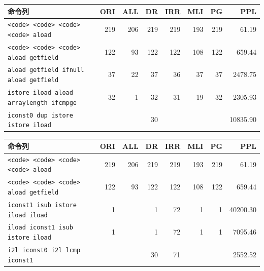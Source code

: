 \documentclass[12pt,twoside]{jreport}
\begin{document}
\begin{table}[t]
{  
  \begin{tabular}{lrrrrrrr}
   命令列 &
    \multicolumn{1}{p{1cm}}{ORI} & 
    \multicolumn{1}{p{1cm}}{ALL} & 
    \multicolumn{1}{p{1cm}}{DR} & 
    \multicolumn{1}{p{1cm}}{IRR} & 
    \multicolumn{1}{p{1cm}}{MLI} & 
    \multicolumn{1}{p{1cm}}{PG} & 
    \multicolumn{1}{p{1cm}}{PPL} \\ \hline
      \texttt{<code> <code> <code> <code> aload}    & 219 & 206 & 219 & 219 & 193 & 219 & 61.19 \\
    \texttt{<code> <code> <code> aload getfield}    & 122 &  93 & 122 & 122 & 108 & 122 & 659.44 \\
    \texttt{aload getfield ifnull aload getfield}   & 37  &  22 &  37 &  36 &  37 &  37 & 2478.75 \\
    \texttt{istore iload aload arraylength ifcmpge} & 32  &   1 &  32 &  31 &  19 &  32 & 2305.93 \\
    \texttt{iconst0 dup istore istore iload}        &     &     &  30 &     &     &     & 10835.90\\
  \end{tabular}
  
  
  \begin{tabular}{lrrrrrrr}
   命令列 &
    \multicolumn{1}{p{1cm}}{ORI} & 
    \multicolumn{1}{p{1cm}}{ALL} & 
    \multicolumn{1}{p{1cm}}{DR} & 
    \multicolumn{1}{p{1cm}}{IRR} & 
    \multicolumn{1}{p{1cm}}{MLI} & 
    \multicolumn{1}{p{1cm}}{PG} & 
    \multicolumn{1}{p{1cm}}{PPL} \\ \hline
   \texttt{<code> <code> <code> <code> aload}      & 219 & 206 & 219 & 219 & 193 & 219 & 61.19 \\
    \texttt{<code> <code> <code> aload getfield}   & 122 &  93 & 122 & 122 & 108 & 122 & 659.44 \\
    \texttt{iconst1 isub istore iload iload}       &   1 &     &   1 &  72 &   1 &   1 & 40200.30 \\
    \texttt{iload iconst1 isub istore iload}       &   1 &     &   1 &  72 &   1 &   1 & 7095.46 \\
    \texttt{i2l iconst0 i2l lcmp iconst1}          &     &     &  30 &  71 &     &     & 2552.52 \\
  \end{tabular}
  
}
\end{table}
\end{document}
